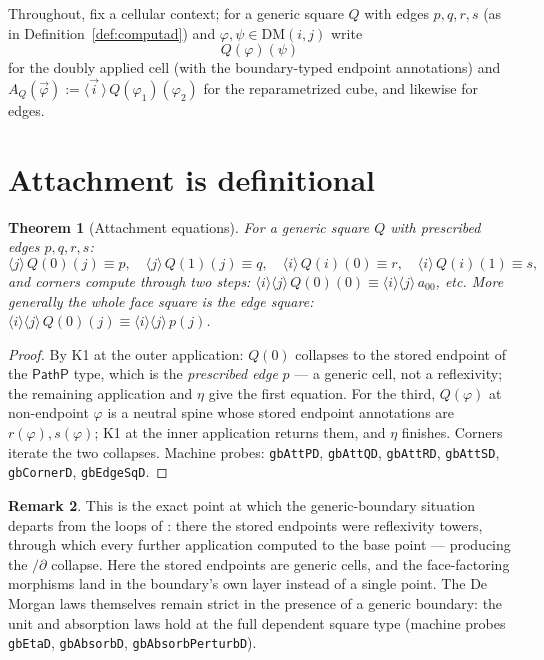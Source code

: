 \documentclass[11pt]{amsart}
\newtheorem{thm}{Theorem}[section]
\theoremstyle{definition}
\newtheorem{rem}[thm]{Remark}
\newcommand{\DM}[1]{\mathrm{DM}(#1)}
\newcommand{\aconv}{\equiv}
\newcommand{\PathP}{\mathsf{PathP}}
\newcommand{\act}[1]{A_{#1}}
\begin{document}
Throughout, fix a cellular context; for a generic square $Q$ with
edges $p, q, r, s$ (as in Definition~\ref{def:computad}) and
$\varphi, \psi \in \DM{i,j}$ write
\[
  Q(\varphi)(\psi)
\]
for the doubly applied cell (with the boundary-typed endpoint
annotations) and
$\act{Q}(\vec\varphi) := \langle \vec i\, \rangle\,
Q(\varphi_1)(\varphi_2)$ for the reparametrized cube, and likewise
for edges.

\section{Attachment is definitional}
\label{sec:attach}

\begin{thm}[Attachment equations]\label{thm:attach}
  For a generic square $Q$ with prescribed edges $p, q, r, s$:
  \[
    \langle j \rangle\, Q(0)(j) \aconv p, \quad
    \langle j \rangle\, Q(1)(j) \aconv q, \quad
    \langle i \rangle\, Q(i)(0) \aconv r, \quad
    \langle i \rangle\, Q(i)(1) \aconv s,
  \]
  and corners compute through two steps:
  $\langle i \rangle \langle j \rangle\, Q(0)(0) \aconv
  \langle i \rangle \langle j \rangle\, a_{00}$, etc.
  More generally the whole face square is the edge square:
  $\langle i \rangle \langle j \rangle\, Q(0)(j) \aconv
  \langle i \rangle \langle j \rangle\, p(j)$.
\end{thm}
\begin{proof}
  By K1 at the outer application: $Q(0)$ collapses to the stored
  endpoint of the $\PathP$ type, which is the \emph{prescribed edge}
  $p$ --- a generic cell, not a reflexivity; the remaining
  application and $\eta$ give the first equation.  For the third,
  $Q(\varphi)$ at non-endpoint $\varphi$ is a neutral spine whose
  stored endpoint annotations are $r(\varphi), s(\varphi)$; K1 at
  the inner application returns them, and $\eta$ finishes.  Corners
  iterate the two collapses.  Machine probes: \texttt{gbAttPD},
  \texttt{gbAttQD}, \texttt{gbAttRD}, \texttt{gbAttSD},
  \texttt{gbCornerD}, \texttt{gbEdgeSqD}.
\end{proof}

\begin{rem}
  This is the exact point at which the generic-boundary situation
  departs from the loops of \cite{Sphere}: there the stored
  endpoints were reflexivity towers, through which every further
  application computed to the base point --- producing the
  $/\partial$ collapse.  Here the stored endpoints are generic
  cells, and the face-factoring morphisms land in the boundary's
  own layer instead of a single point.  The De Morgan laws
  themselves remain strict in the presence of a generic boundary:
  the unit and absorption laws hold at the full dependent square
  type (machine probes \texttt{gbEtaD}, \texttt{gbAbsorbD},
  \texttt{gbAbsorbPerturbD}).
\end{rem}
\end{document}
